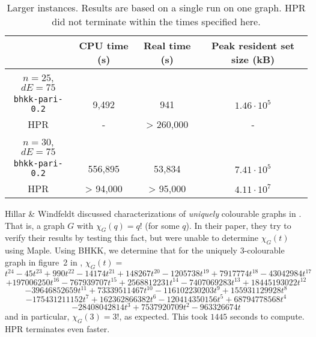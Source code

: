 \documentclass[a4paper]{article}
\newcommand{\code}{\texttt}
\begin{document}
\begin{table}[H]\centering
 \begin{tabular}{|c|c|c|c|} \hline
  & CPU time (s) & Real time (s) & Peak resident set size (kB) \\ \hline
  $n = 25$, $dE = 75$ & & & \\ \hline
  \code{bhkk-pari-0.2} & 9,492 & 941 & $1.46 \cdot 10^{5}$ \\ \hline
  HPR & - & > 260,000 & - \\ \hline
  $n = 30$, $dE = 75$ &  &  &  \\ \hline
  \code{bhkk-pari-0.2} & 556,895 & 53,834 & $7.41 \cdot 10^{5}$ \\ \hline
  HPR & > 94,000 & > 95,000 & $4.11 \cdot 10^{7}$ \\ \hline
 \end{tabular}
 \caption{Larger instances. Results are based on a single run on one graph. HPR did not terminate within the times specified here.}
\end{table}

Hillar \& Windfeldt discussed characterizations of \emph{uniquely} colourable graphs in \cite{hillar_windfeldt}. That is, a graph $G$ with $\chi_G(q) = q!$ (for some $q$). In their paper, they try to verify their results by testing this fact, but were unable to determine $\chi_G(t)$ using Maple. Using BHKK, we determine that for the uniquely 3-colourable graph in figure~2 in \cite{hillar_windfeldt}, $\chi_G(t) = $
$$
t^{24} - 45t^{23} + 990t^{22} -14174t^{21} + 148267t^{20} - 1205738t^{19} + 7917774t^{18} - 43042984t^{17}
$$
$$
+ 197006250t^{16} - 767939707t^{15} + 2568812231t^{14} - 7407069283t^{13} + 18445193022t^{12}
$$
$$
- 39646852659t^{11} + 73339511467t^{10} - 116102230203t^9 + 155931129928t^8
$$
$$
- 175431211152t^7 + 162362866382t^6 - 120414350156t^5 + 68794778568t^4
$$
$$
- 28408042814t^3 + 7537920709t^2 - 963326674t
$$
and in particular, $\chi_G(3) = 3!$, as expected. This took $1445$ seconds to compute. HPR terminates even faster.
\end{document}
